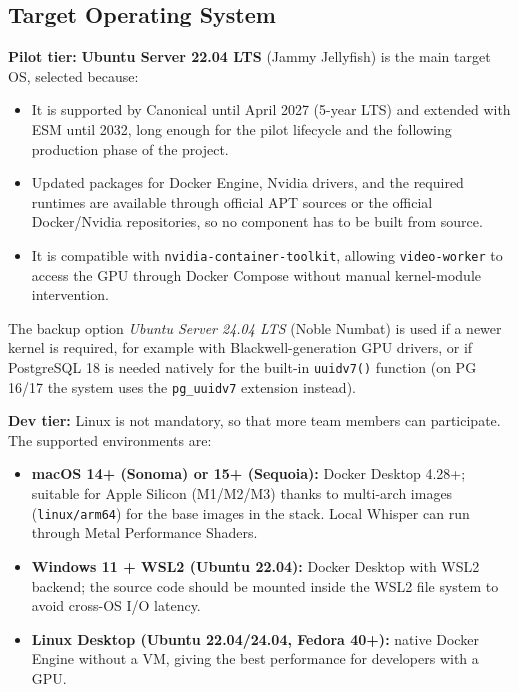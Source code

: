 \subsection{Target Operating System}

\textbf{Pilot tier:} \textbf{Ubuntu Server 22.04 LTS} (Jammy
Jellyfish) is the main target OS, selected because:

\begin{itemize}
    \item It is supported by Canonical until April 2027 (5-year LTS)
          and extended with ESM until 2032, long enough for the pilot
          lifecycle and the following production phase of the project.
    \item Updated packages for Docker Engine, Nvidia drivers, and the
          required runtimes are available through official APT sources
          or the official Docker/Nvidia repositories, so no component
          has to be built from source.
    \item It is compatible with \texttt{nvidia-container-toolkit},
          allowing \texttt{video-worker} to access the GPU through
          Docker Compose without manual kernel-module intervention.
\end{itemize}

The backup option \textit{Ubuntu Server 24.04 LTS} (Noble Numbat) is
used if a newer kernel is required, for example with Blackwell-generation
GPU drivers, or if PostgreSQL 18 is needed natively for the built-in
\texttt{uuidv7()} function (on PG 16/17 the system uses the
\texttt{pg\_uuidv7} extension instead).

\textbf{Dev tier:} Linux is not mandatory, so that more team members
can participate. The supported environments are:

\begin{itemize}
    \item \textbf{macOS 14+ (Sonoma) or 15+ (Sequoia):} Docker Desktop
          4.28+; suitable for Apple Silicon (M1/M2/M3) thanks to
          multi-arch images (\texttt{linux/arm64}) for the base images
          in the stack. Local Whisper can run through Metal Performance
          Shaders.
    \item \textbf{Windows 11 + WSL2 (Ubuntu 22.04):} Docker Desktop
          with WSL2 backend; the source code should be mounted inside
          the WSL2 file system to avoid cross-OS I/O latency.
    \item \textbf{Linux Desktop (Ubuntu 22.04/24.04, Fedora 40+):}
          native Docker Engine without a VM, giving the best performance
          for developers with a GPU.
\end{itemize}

